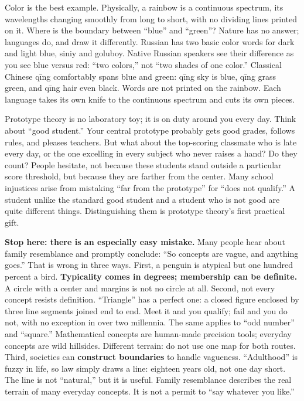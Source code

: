 Color is the best example. Physically, a rainbow is a continuous spectrum, its wavelengths changing smoothly from long to short, with no dividing lines printed on it. Where is the boundary between ``blue'' and ``green''? Nature has no answer; languages do, and draw it differently. Russian has two basic color words for dark and light blue, siniy and goluboy. Native Russian speakers see their difference as you see blue versus red: ``two colors,'' not ``two shades of one color.'' Classical Chinese qīng comfortably spans blue and green: qīng sky is blue, qīng grass green, and qīng hair even black. Words are not printed on the rainbow. Each language takes its own knife to the continuous spectrum and cuts its own pieces.

Prototype theory is no laboratory toy; it is on duty around you every day. Think about ``good student.'' Your central prototype probably gets good grades, follows rules, and pleases teachers. But what about the top-scoring classmate who is late every day, or the one excelling in every subject who never raises a hand? Do they count? People hesitate, not because these students stand outside a particular score threshold, but because they are farther from the center. Many school injustices arise from mistaking ``far from the prototype'' for ``does not qualify.'' A student unlike the standard good student and a student who is not good are quite different things. Distinguishing them is prototype theory's first practical gift.

\textbf{Stop here: there is an especially easy mistake.} Many people hear about family resemblance and promptly conclude: ``So concepts are vague, and anything goes.'' That is wrong in three ways. First, a penguin is atypical but one hundred percent a bird. \textbf{Typicality comes in degrees; membership can be definite.} A circle with a center and margins is not no circle at all. Second, not every concept resists definition. ``Triangle'' has a perfect one: a closed figure enclosed by three line segments joined end to end. Meet it and you qualify; fail and you do not, with no exception in over two millennia. The same applies to ``odd number'' and ``square.'' Mathematical concepts are human-made precision tools; everyday concepts are wild hillsides. Different terrain: do not use one map for both routes. Third, societies can \textbf{construct boundaries} to handle vagueness. ``Adulthood'' is fuzzy in life, so law simply draws a line: eighteen years old, not one day short. The line is not ``natural,'' but it is useful. Family resemblance describes the real terrain of many everyday concepts. It is not a permit to ``say whatever you like.''

